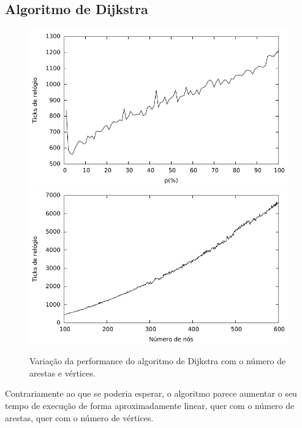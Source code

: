 \documentclass[a4paper,12pt,titlepage]{article}
\begin{document}
\subsection{Algoritmo de Dijkstra}
\begin{figure}[!h]
\includegraphics{dijkstra_edges.pdf}
\includegraphics{dijkstra_nodes.pdf}
\caption{Variação da performance do algoritmo de Dijkstra com o número de arestas e vértices.}
\end{figure}

Contrariamente ao que se poderia esperar, o algoritmo parece aumentar o seu tempo de execução de forma aproximadamente linear, quer com o número de arestas, quer com o número de vértices.
\end{document}

